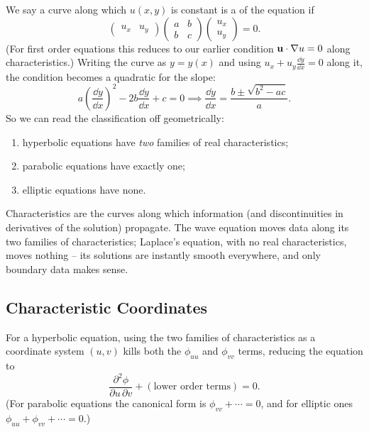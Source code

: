 \documentclass[a4paper]{scrartcl}
\begin{document}
We say a curve along which $u(x,y)$ is constant is a  of the equation if
$$
\begin{pmatrix} u_x & u_y \end{pmatrix} \begin{pmatrix} a & b \\ b & c\end{pmatrix}\begin{pmatrix} u_x \\ u_y\end{pmatrix} = 0.
$$
(For first order equations this reduces to our earlier condition $\mathbf{u} \cdot \nabla u = 0$ along characteristics.) Writing the curve as $y = y(x)$ and using $u_x + u_y \frac{\dd y}{\dd x} = 0$ along it, the condition becomes a quadratic for the slope:
$$
a \left(\frac{\dd y}{\dd x}\right)^2 - 2b \frac{\dd y}{\dd x} + c = 0 \implies \frac{\dd y}{\dd x} = \frac{b \pm \sqrt{b^2 - ac}}{a}.
$$
So we can read the classification off geometrically:
\begin{enumerate}[label=(\roman*)]
    \item hyperbolic equations have \emph{two} families of real characteristics;
    \item parabolic equations have exactly one;
    \item elliptic equations have none.
\end{enumerate}
Characteristics are the curves along which information (and discontinuities in derivatives of the solution) propagate. The wave equation moves data along its two families of characteristics; Laplace's equation, with no real characteristics, moves nothing -- its solutions are instantly smooth everywhere, and only boundary data makes sense.

\subsection{Characteristic Coordinates}

For a hyperbolic equation, using the two families of characteristics as a coordinate system $(u, v)$ kills both the $\phi_{uu}$ and $\phi_{vv}$ terms, reducing the equation to 
$$
\frac{\partial^2 \phi}{\partial u \, \partial v} + (\text{lower order terms}) = 0.
$$
(For parabolic equations the canonical form is $\phi_{vv} + \cdots = 0$, and for elliptic ones $\phi_{uu} + \phi_{vv} + \cdots = 0$.)
\end{document}
